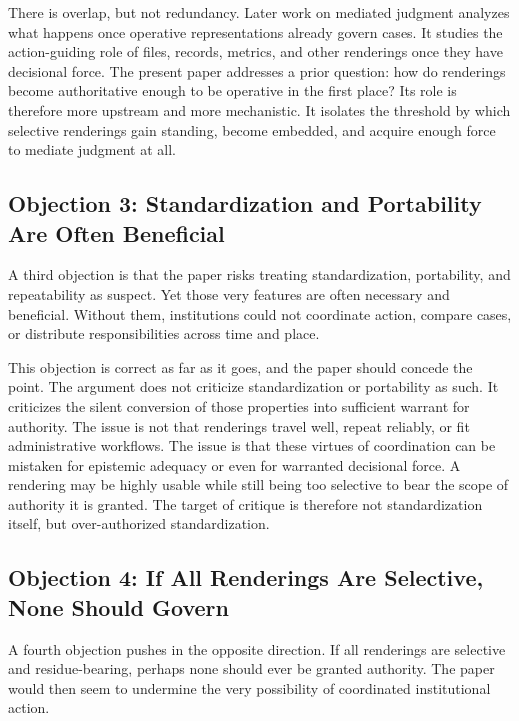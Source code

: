 \documentclass[11pt]{article}
\begin{document}
There is overlap, but not redundancy. Later work on mediated judgment analyzes what happens once operative representations already govern cases. It studies the action-guiding role of files, records, metrics, and other renderings once they have decisional force. The present paper addresses a prior question: how do renderings become authoritative enough to be operative in the first place? Its role is therefore more upstream and more mechanistic. It isolates the threshold by which selective renderings gain standing, become embedded, and acquire enough force to mediate judgment at all.\cite{Swanson2026MediatedJudgmentConstraint}

\subsection{Objection 3: Standardization and Portability Are Often Beneficial}

A third objection is that the paper risks treating standardization, portability, and repeatability as suspect. Yet those very features are often necessary and beneficial. Without them, institutions could not coordinate action, compare cases, or distribute responsibilities across time and place.\cite{TimmermansEpstein2010WorldOfStandards,Porter1995TrustInNumbers}

This objection is correct as far as it goes, and the paper should concede the point. The argument does not criticize standardization or portability as such. It criticizes the silent conversion of those properties into sufficient warrant for authority. The issue is not that renderings travel well, repeat reliably, or fit administrative workflows. The issue is that these virtues of coordination can be mistaken for epistemic adequacy or even for warranted decisional force. A rendering may be highly usable while still being too selective to bear the scope of authority it is granted. The target of critique is therefore not standardization itself, but over-authorized standardization.

\subsection{Objection 4: If All Renderings Are Selective, None Should Govern}

A fourth objection pushes in the opposite direction. If all renderings are selective and residue-bearing, perhaps none should ever be granted authority. The paper would then seem to undermine the very possibility of coordinated institutional action.
\end{document}

